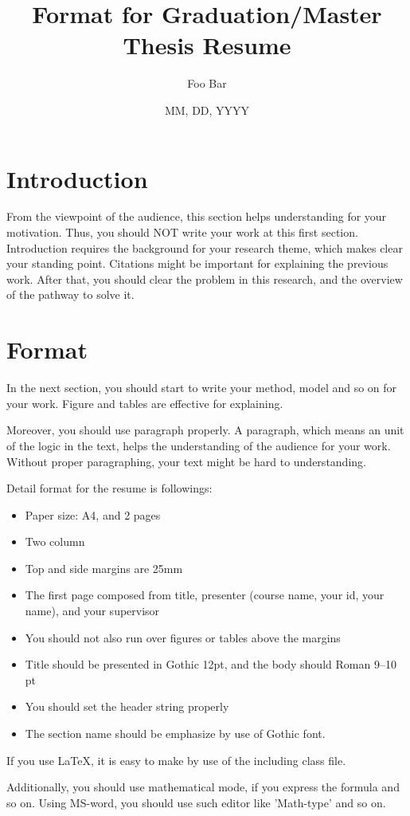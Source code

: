 \documentclass[twocolumn, a4paper]{UECIEresumeE}
\title{Format for Graduation/Master Thesis Resume}
\date{MM, DD, YYYY}
\affiliation{Dept. of Informatics, Faculty of Information and Engineering, UEC.}
\author{Foo Bar}
\begin{document}
\maketitle

\section{Introduction}
From the viewpoint of the audience, this section helps understanding for your motivation.
Thus, you should NOT write your work at this first section.
Introduction requires the background for your research theme, 
which makes clear your standing point.
Citations might be important for explaining the previous work.
After that, you should clear the problem in this research, and the overview of the pathway to solve it.


\section{Format}
In the next section, you should start to write your method, model and so on for your work.
Figure and tables are effective for explaining.

Moreover, you should use paragraph properly. 
A paragraph, which means an unit of the logic in the text, helps the understanding of the audience for your work. Without proper paragraphing, your text might be hard to understanding.

Detail format for the resume is followings:
\begin{itemize}
  \item{Paper size: A4, and 2 pages}
  \item{Two column}
  \item{Top and side margins are 25mm}
  \item{The first page composed from title, presenter (course name, your id, your name), and your supervisor}
  \item{You should not also run over figures or tables above the margins}
  \item{Title should be presented in Gothic 12pt, and the body should Roman 9--10 pt}
  \item{You should set the header string properly}
  \item{The section name should be emphasize by use of Gothic font.}
\end{itemize}
If you use \LaTeX, it is easy to make by use of the including class file.

Additionally, you should use mathematical mode, if you express the formula and so on.
Using MS-word, you should use such editor like 'Math-type' and so on.
\end{document}
